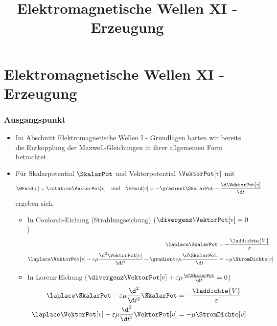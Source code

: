 
  
\title[TET: Elektromagnetische Wellen XI - Erzeugung]{Elektromagnetische Wellen XI - Erzeugung}


% 
% 

\maketitle

% 
% 
\section{Elektromagnetische Wellen XI - Erzeugung}

\begin{frame}
  \frametitle{Ausgangspunkt}
  \begin{itemize}[<+->]
  \item Im Abschnitt \alert{Elektromagnetische Wellen I - Grundlagen} hatten wir bereits die Entkopplung der Maxwell-Gleichungen in ihrer allgemeinen Form betrachtet.
  \item Für \alert{Skalarpotential} \(\SkalarPot\) und \alert{Vektorpotential} \(\VektorPot[v]\) mit
    \begin{equation*}
      \BFeld[v]=\rotation\VektorPot[v] \quad\text{und}\quad \EFeld[v]=-\gradient\SkalarPot -\frac{\d \VektorPot[v]}{\d t}
    \end{equation*}
    ergeben sich:
    \begin{itemize}[<+->]
    \item In \alert{Coulomb-Eichung} (Strahlungseichung) (\(\divergenz \VektorPot[v] =0\))
      \begin{align*}
        \laplace\SkalarPot &= -\frac{\laddichte{V}}{\varepsilon} \\
        \laplace\VektorPot[v]-\varepsilon\mu\frac{\d^2 \VektorPot[v]}{\d t^2}-\gradient \varepsilon\mu\frac{\d \SkalarPot}{\d t} &= -\mu \StromDichte[v]
      \end{align*}
    \item In \alert{Lorenz-Eichung} (\(\divergenz\VektorPot[v] +\varepsilon\mu \frac{\d \SkalarPot}{\d t}=0\))
      \begin{align*}
\laplace\SkalarPot-\varepsilon\mu \frac{\d^2}{\d t^2}\SkalarPot &= -\frac{\laddichte{V}}{\varepsilon}\\
\laplace\VektorPot[v]-\varepsilon\mu \frac{\d^2}{\d t^2}\VektorPot[v] &= -\mu \StromDichte[v]
\end{align*}

      \end{itemize}
\end{itemize}
\end{frame}

